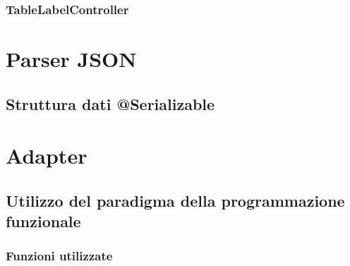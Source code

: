 \subsubsection{TableLabelController}

\section{Parser JSON}
\subsection{Struttura dati @Serializable}

\section{Adapter}
\subsection{Utilizzo del paradigma della programmazione funzionale}
\subsubsection{Funzioni utilizzate}








